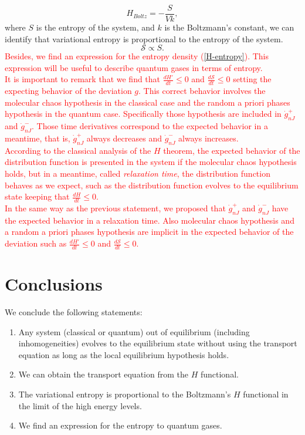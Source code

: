 \documentclass{article}
\newcommand{\Ss}{\mathcal{S}}
\begin{document}
\begin{equation}
    H_{Boltz}=-\frac{S}{Vk},
\end{equation}
where $S$ is the entropy of the system, and $k$ is the Boltzmann's constant, we can identify that variational entropy is proportional to the entropy of the system.\\
\begin{equation}
    \Ss\propto S.
\end{equation}
\textcolor{red}{Besides, we find an expression for the entropy density (\ref{H-entropy}). This expression will be useful to describe quantum gases in terms of entropy.\\
It is important to remark that we find that $\frac{dH'}{dt}\leq 0$ and $\frac{d\Ss}{dt}\leq 0$ setting the expecting behavior of the deviation $g$. This correct behavior involves the molecular chaos hypothesis in the classical case and the random a priori phases hypothesis in the quantum case. Specifically those hypothesis are included in $\dot{g}_{nJ}^{+}$ and $\dot{g}_{nJ}^{-}$. Those time derivatives correspond to the expected behavior in a meantime, that is, $\dot{g}_{nJ}^{+}$ always decreases and $\dot{g}_{nJ}^{-}$ always increases.\\ 
According to the classical analysis of the $H$ theorem, the expected behavior of the distribution function is presented in the system if the molecular chaos hypothesis holds, but in a meantime, called \textit{relaxation time}, the distribution function behaves as we expect, such as the distribution function evolves to the equilibrium state keeping that $\frac{dH}{dt}\leq 0$.\\
In the same way as the previous statement, we proposed that $\dot{g}_{nJ}^{+}$ and $\dot{g}_{nJ}^{-}$ have the expected behavior in a relaxation time. Also molecular chaos hypothesis and a random a priori phases hypothesis are implicit in the expected behavior of the deviation such as $\frac{dH'}{dt}\leq 0$ and $\frac{d\Ss}{dt}\leq 0$.}


\section{Conclusions}
We conclude the following statements:\\
\begin{enumerate}
    \item Any system (classical or quantum) out of equilibrium (including inhomogeneities) evolves to the equilibrium state without using the transport equation as long as the local equilibrium hypothesis holds.
    \item We can obtain the transport equation from the $H$ functional.
    \item The variational entropy is proportional to the Boltzmann's $H$ functional in the limit of the high energy levels.
    \item We find an expression for the entropy to quantum gases.
    \end{enumerate}
  
\end{document}

